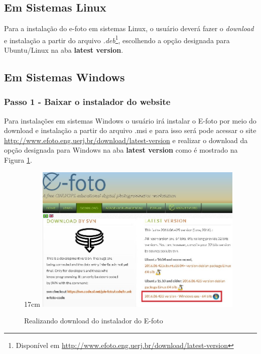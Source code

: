 \subsection{Em Sistemas Linux}
Para a instalação do e-foto em sistemas Linux, o usuário deverá fazer o \textit{download} e instalação a partir do arquivo \textit{.deb}\footnote{Disponível em  \url{http://www.efoto.eng.uerj.br/download/latest-version}}, escolhendo a opção designada para Ubuntu/Linux na aba \textbf{latest version}.
\subsection{Em Sistemas Windows}
\subsubsection{Passo 1 - Baixar o instalador do website}
Para instalações em sistemas Windows o usuário irá instalar o E-foto por meio do download e instalação a partir do arquivo .msi e para isso será pode acessar o site \url{http://www.efoto.eng.uerj.br/download/latest-version} e realizar o download da opção designada para Windows na aba \textbf{latest version} como é mostrado na Figura \ref{fig:downmsi}. %
\begin{figure}[!ht]{17cm}
	\centering
	\includegraphics[width=10cm]{Figuras/downmsi.jpg} %
	\caption{Realizando download do instalador do E-foto} \label{fig:downmsi}
\end{figure}

